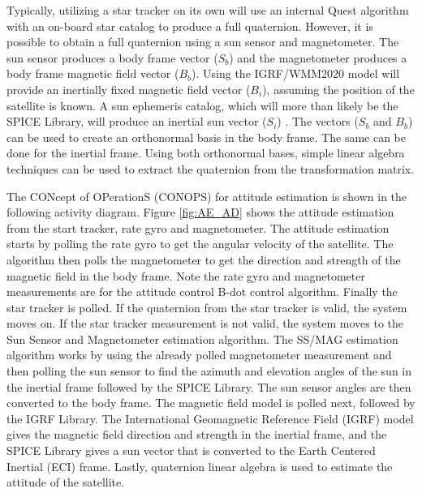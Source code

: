 \documentclass[conf]{new-aiaa}
\begin{document}
Typically, utilizing a star tracker on its own will use an internal Quest algorithm with an on-board star catalog to produce a full quaternion. However, it is possible to obtain a full quaternion using a sun sensor and magnetometer. The sun sensor produces a body frame vector ($S_{b}$) and the magnetometer produces a body frame magnetic field vector ($B_{b}$). Using the IGRF/WMM2020 model will provide an inertially fixed magnetic field vector ($B_{i}$), assuming the position of the satellite is known. A sun ephemeris catalog, which will more than likely be the SPICE Library, will produce an inertial sun vector ($S_{i}$) \cite{SPICE}. The vectors ($S_{b}$ and $B_{b}$) can be used to create an orthonormal basis in the body frame. The same can be done for the inertial frame. Using both orthonormal bases, simple linear algebra techniques can be used to extract the quaternion from the transformation matrix.

The CONcept of OPerationS (CONOPS) for attitude estimation is shown in the following activity diagram. Figure \ref{fig:AE_AD} shows the attitude estimation from the start tracker, rate gyro and magnetometer. The attitude estimation starts by polling the rate gyro to get the angular velocity of the satellite. The algorithm then polls the magnetometer to get the direction and strength of the magnetic field in the body frame. Note the rate gyro and magnetometer measurements are for the attitude control B-dot control algorithm. Finally the star tracker is polled. If the quaternion from the star tracker is valid, the system moves on. If the star tracker measurement is not valid, the system moves to the Sun Sensor and Magnetometer estimation algorithm. The SS/MAG estimation algorithm works by using the already polled magnetometer measurement and then polling the sun sensor to find the azimuth and elevation angles of the sun in the inertial frame followed by the SPICE Library. The sun sensor angles are then converted to the body frame. The magnetic field model is polled next, followed by the IGRF Library. The International Geomagnetic Reference Field (IGRF) model gives the magnetic field direction and strength in the inertial frame, and the SPICE Library gives a sun vector that is converted to the Earth Centered Inertial (ECI) frame. Lastly, quaternion linear algebra is used to estimate the attitude of the satellite.

\end{document}
